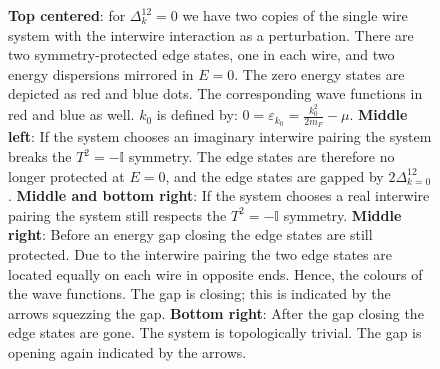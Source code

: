 \begin{figure}
\begin{tikzpicture}
\end{tikzpicture}
\caption{\textbf{Top centered}: for $\Delta^{12}_k=0$ we have two copies of the single wire system with the interwire interaction as a perturbation. There are two symmetry-protected edge states, one in each wire, and two energy dispersions mirrored in $E = 0$. The zero energy states are depicted as red and blue dots. The corresponding wave functions in red and blue as well. $k_0$ is defined by: $0 = \varepsilon_{k_0} = \frac{k^2_0}{2m_F} - \mu$. \textbf{Middle left}: If the system chooses an imaginary interwire pairing the system breaks the $T^2 = -\mathbb{I}$ symmetry. The edge states are therefore no longer protected at $E = 0$, and the edge states are gapped by $2\Delta^{12}_{k=0}$. \textbf{Middle and bottom right}: If the system chooses a real interwire pairing the system still respects the $T^2 = -\mathbb{I}$ symmetry. \textbf{Middle right}: Before an energy gap closing the edge states are still protected. Due to the interwire pairing the two edge states are located equally on each wire in opposite ends. Hence, the colours of the wave functions. The gap is closing; this is indicated by the arrows squezzing the gap. 
\textbf{Bottom right}: After the gap closing the edge states are gone. The system is topologically trivial. The gap is opening again indicated by the arrows.}
\label{fig.2wiresedgestates}
\end{figure}

